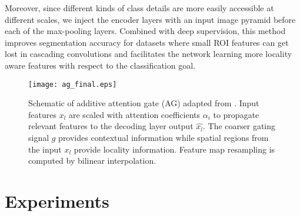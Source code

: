 \documentclass{article}
\begin{document}
Moreover, since different kinds of class details are more
easily accessible at different scales, we inject the encoder layers with an input image pyramid before each of the max-pooling layers. Combined with deep supervision, this method improves segmentation accuracy for datasets where small ROI features can get lost in cascading convolutions and facilitates the network learning more locality aware features with respect to the classification goal.

\begin{figure}
	\centering
	\centerline{\texttt{[image: ag\_final.eps]}}
\caption{ Schematic of additive attention gate (AG) adapted from 			\cite{oktay}. Input features $x_l$ are scaled with attention coefficients $\alpha_i$ to propagate relevant features to the decoding layer output $\hat{x_l}$. The coarser gating signal $g$ provides contextual information while spatial regions from the input $x_l$ provide locality information. Feature map resampling is computed by bilinear interpolation. }\label{fig:ag}	
\end{figure}

\section{Experiments}
\label{sec:results}

\end{document}

